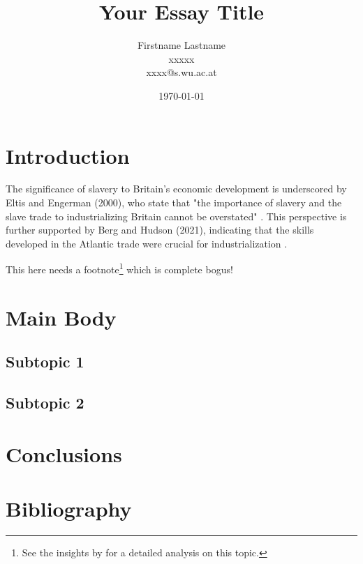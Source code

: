 \documentclass[a4paper,11pt]{article}
\begin{document}
\title{Your Essay Title}
\author{Firstname Lastname \\ xxxxx \\ xxxx@s.wu.ac.at}
\date{\today} %
\maketitle

\section*{Introduction}

The significance of slavery to Britain's economic development is underscored by Eltis and Engerman (2000), who state that "the importance of slavery and the slave trade to industrializing Britain cannot be overstated" \citep{eltisengerman2000}. This perspective is further supported by Berg and Hudson (2021), indicating that the skills developed in the Atlantic trade were crucial for industrialization \citep{berghudson2021}.

This here needs a footnote\footnote{See the insights by \citep{drescher1997} for a detailed analysis on this topic.} which is complete bogus!

\section{Main Body}
\subsection{Subtopic 1}

\subsection{Subtopic 2}

\section{Conclusions}

\section*{Bibliography}
\end{document}
